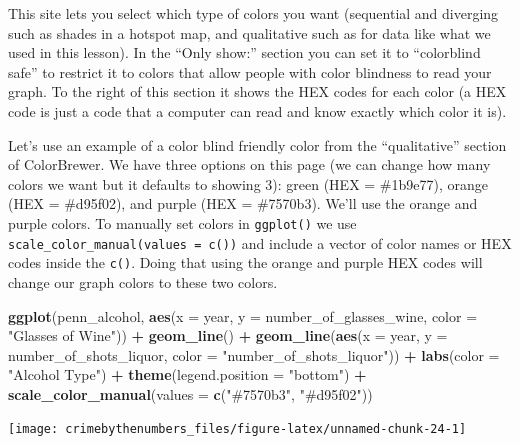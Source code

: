 \documentclass[
  12pt,
]{book}
\newenvironment{Shaded}{\begin{snugshade}}{\end{snugshade}}
\newcommand{\DataTypeTok}[1]{\textcolor[rgb]{0.27,0.27,0.27}{#1}}
\newcommand{\KeywordTok}[1]{\textcolor[rgb]{0.27,0.27,0.27}{\textbf{#1}}}
\newcommand{\NormalTok}[1]{#1}
\newcommand{\OperatorTok}[1]{\textcolor[rgb]{0.43,0.43,0.43}{\textbf{#1}}}
\newcommand{\StringTok}[1]{\textcolor[rgb]{0.5,0.5,0.5}{#1}}
\begin{document}
This site lets you select which type of colors you want (sequential and diverging such as shades in a hotspot map, and qualitative such as for data like what we used in this lesson). In the ``Only show:'' section you can set it to ``colorblind safe'' to restrict it to colors that allow people with color blindness to read your graph. To the right of this section it shows the HEX codes for each color (a HEX code is just a code that a computer can read and know exactly which color it is).

Let's use an example of a color blind friendly color from the ``qualitative'' section of ColorBrewer. We have three options on this page (we can change how many colors we want but it defaults to showing 3): green (HEX = \#1b9e77), orange (HEX = \#d95f02), and purple (HEX = \#7570b3). We'll use the orange and purple colors. To manually set colors in \texttt{ggplot()} we use \texttt{scale\_color\_manual(values\ =\ c())} and include a vector of color names or HEX codes inside the \texttt{c()}. Doing that using the orange and purple HEX codes will change our graph colors to these two colors.

\begin{Shaded}
\begin{Highlighting}[]
\KeywordTok{ggplot}\NormalTok{(penn\_alcohol, }\KeywordTok{aes}\NormalTok{(}\DataTypeTok{x =}\NormalTok{ year, }\DataTypeTok{y =}\NormalTok{ number\_of\_glasses\_wine,}
                         \DataTypeTok{color =} \StringTok{"Glasses of Wine"}\NormalTok{)) }\OperatorTok{+}
\StringTok{  }\KeywordTok{geom\_line}\NormalTok{() }\OperatorTok{+}
\StringTok{  }\KeywordTok{geom\_line}\NormalTok{(}\KeywordTok{aes}\NormalTok{(}\DataTypeTok{x =}\NormalTok{ year, }\DataTypeTok{y =}\NormalTok{ number\_of\_shots\_liquor,}
                \DataTypeTok{color =} \StringTok{"number\_of\_shots\_liquor"}\NormalTok{)) }\OperatorTok{+}
\StringTok{  }\KeywordTok{labs}\NormalTok{(}\DataTypeTok{color =} \StringTok{"Alcohol Type"}\NormalTok{) }\OperatorTok{+}
\StringTok{  }\KeywordTok{theme}\NormalTok{(}\DataTypeTok{legend.position =} \StringTok{"bottom"}\NormalTok{) }\OperatorTok{+}
\StringTok{  }\KeywordTok{scale\_color\_manual}\NormalTok{(}\DataTypeTok{values =} \KeywordTok{c}\NormalTok{(}\StringTok{"\#7570b3"}\NormalTok{, }\StringTok{"\#d95f02"}\NormalTok{))}
\end{Highlighting}
\end{Shaded}

\begin{center}\texttt{[image: crimebythenumbers\_files/figure-latex/unnamed-chunk-24-1]} \end{center}
\end{document}
